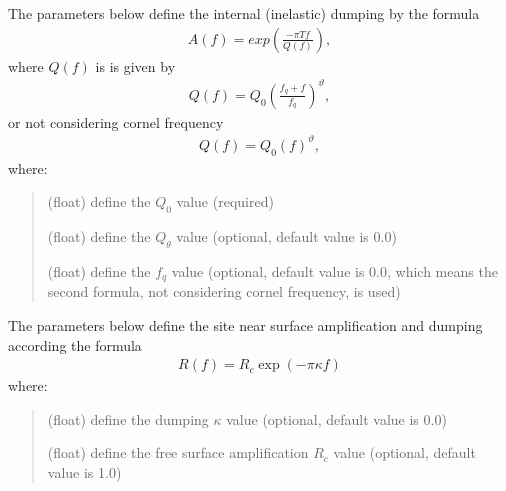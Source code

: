 \documentclass[letterpaper,10pt,english]{sphinxmanual}
\begin{document}
\sphinxAtStartPar
The parameters below define the internal (inelastic) dumping by the formula
\begin{equation*}
\begin{split}A\left(f\right)=exp\left(\frac{-\pi Tf}{Q\left(f\right)}\right),\end{split}
\end{equation*}
\sphinxAtStartPar
where \(Q\left(f\right)\) is is given by
\begin{equation*}
\begin{split}Q\left(f\right)=Q_0\left(\frac{f_q+f}{f_q}\right)^\vartheta,\end{split}
\end{equation*}
\sphinxAtStartPar
or not considering cornel frequency
\begin{equation*}
\begin{split}Q\left(f\right)=Q_0\left( f \right)^\vartheta,\end{split}
\end{equation*}
\sphinxAtStartPar
where:
\begin{quote}\begin{description}
\sphinxAtStartPar
(float) define the \(Q_0\) value (required)

\sphinxAtStartPar
(float) define the \(Q_{\theta}\) value (optional, default value is 0.0)

\sphinxAtStartPar
(float) define the \(f_q\) value (optional, default value is 0.0,
which means the second formula, not considering cornel frequency, is used)

\end{description}\end{quote}

\sphinxAtStartPar
The parameters below define the site near surface amplification and dumping according the formula
\begin{equation*}
\begin{split}R\left(f\right)=R_c \exp\left(-\pi \kappa f\right)\end{split}
\end{equation*}
\sphinxAtStartPar
where:
\begin{quote}\begin{description}
\sphinxAtStartPar
(float) define the dumping \(\kappa\) value (optional, default value is 0.0)

\sphinxAtStartPar
(float) define the free surface amplification \(R_c\) value
(optional, default value is 1.0)

\end{description}\end{quote}
\end{document}
